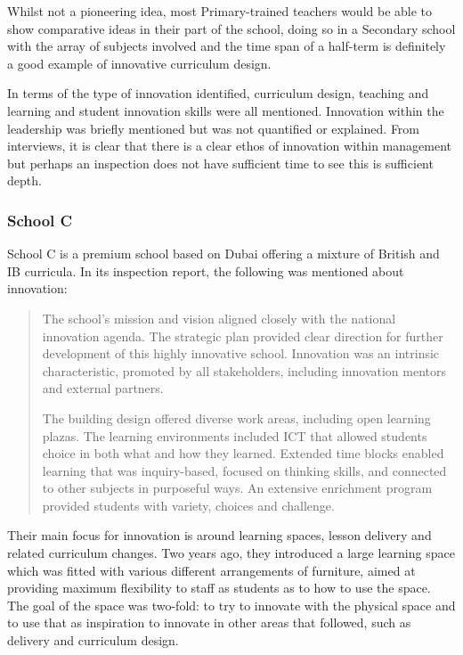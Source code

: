 Whilst not a pioneering idea, most Primary-trained teachers would be able to show comparative ideas in their part of the school, doing so in a Secondary school with the array of subjects involved and the time span of a half-term is definitely a good example of innovative curriculum design.

In terms of the type of innovation identified, curriculum design, teaching and learning and student innovation skills were all mentioned. Innovation within the leadership was briefly mentioned but was not quantified or explained. From interviews, it is clear that there is a clear ethos of innovation within management but perhaps an inspection does not have sufficient time to see this is sufficient depth. 

\subsubsection{School C}
School C is a premium school based on Dubai offering a mixture of British and IB curricula. In its inspection report, the following was mentioned about innovation:

\begin{quote}
The school's mission and vision aligned closely with the national innovation agenda. The strategic plan provided clear direction for further development of this highly innovative school. Innovation was an intrinsic characteristic, promoted by all stakeholders, including innovation mentors and external partners.

The building design offered diverse work areas, including open learning plazas. The learning environments included ICT that allowed students choice in both what and how they learned. Extended time blocks enabled learning that was inquiry-based, focused on thinking skills, and connected to other subjects in purposeful ways. An extensive enrichment program provided students with variety, choices and challenge.
\end{quote}

Their main focus for innovation is around learning spaces, lesson delivery and related curriculum changes. Two years ago, they introduced a large learning space which was fitted with various different arrangements of furniture, aimed at providing maximum flexibility to staff as students as to how to use the space. The goal of the space was two-fold: to try to innovate with the physical space and to use that as inspiration to innovate in other areas that followed, such as delivery and curriculum design. 

